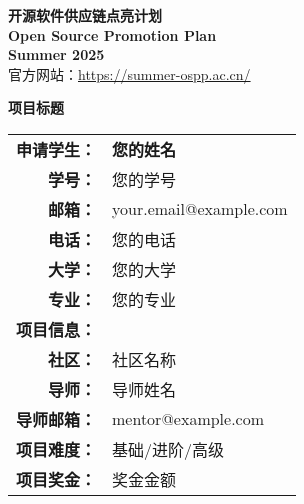 \documentclass[a4paper,12pt]{article}
\makeatletter
\newcommand{\studentname}{您的姓名}
\newcommand{\studentid}{您的学号}
\newcommand{\studentemail}{your.email@example.com}
\newcommand{\studentphone}{您的电话}
\newcommand{\studentuniversity}{您的大学}
\newcommand{\studentmajor}{您的专业}
\newcommand{\projecttitle}{项目标题}
\newcommand{\communityname}{社区名称}
\newcommand{\mentorname}{导师姓名}
\newcommand{\mentoremail}{mentor@example.com}
\newcommand{\projectdifficulty}{基础/进阶/高级}
\newcommand{\projectreward}{奖金金额}
\makeatother
\begin{document}
\begin{titlepage}
    \centering
    
    \vspace{1cm}
    
    \begin{tcolorbox}[
        colback=osppblue!10,
        colframe=osppblue,
        width=\textwidth,
        arc=5pt,
        boxrule=2pt
    ]
    \centering
    {\Huge \textcolor{osppblue}{\textbf{开源软件供应链点亮计划}}} \\
    \vspace{0.3cm}
    {\LARGE \textcolor{osppblue}{\textbf{Open Source Promotion Plan}}} \\
    \vspace{0.2cm}
    {\Large \textcolor{osppgray}{\textbf{Summer 2025}}} \\
    \vspace{0.3cm}
    {\small \textcolor{osppgray}{官方网站：\url{https://summer-ospp.ac.cn/}}}
    \end{tcolorbox}
    
    \vspace{2cm}
    
    \begin{tcolorbox}[
        colback=white,
        colframe=osppgray,
        width=\textwidth,
        arc=3pt
    ]
    {\huge \textcolor{osppdark}{\textbf{\projecttitle}}}
    \end{tcolorbox}
    
    \vspace{1.5cm}
    
    \begin{tcolorbox}[
        colback=gray!5,
        colframe=osppgray,
        width=0.8\textwidth,
        arc=3pt
    ]
    \begin{tabular}{rl}
        \textbf{\textcolor{osppblue}{申请学生：}} & \textbf{\studentname} \\[0.2cm]
        \textbf{学号：} & \studentid \\
        \textbf{邮箱：} & \studentemail \\
        \textbf{电话：} & \studentphone \\
        \textbf{大学：} & \studentuniversity \\
        \textbf{专业：} & \studentmajor \\[0.5cm]
        \textbf{\textcolor{osppblue}{项目信息：}} & \\[0.2cm]
        \textbf{社区：} & \communityname \\
        \textbf{导师：} & \mentorname \\
        \textbf{导师邮箱：} & \mentoremail \\
        \textbf{项目难度：} & \projectdifficulty \\
        \textbf{项目奖金：} & \projectreward \\
    \end{tabular}
    \end{tcolorbox}
    

\end{titlepage}
\end{document}
